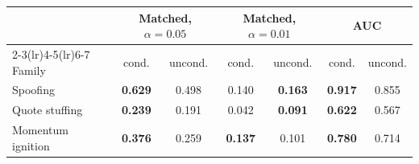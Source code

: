 \begin{tabular}{lcccccc}
\toprule
& \multicolumn{2}{c}{Matched, $\alpha=0.05$} & \multicolumn{2}{c}{Matched, $\alpha=0.01$} & \multicolumn{2}{c}{AUC} \\
\cmidrule(lr){2-3}\cmidrule(lr){4-5}\cmidrule(lr){6-7}
Family & cond. & uncond. & cond. & uncond. & cond. & uncond. \\
\midrule
Spoofing & \textbf{0.629} & 0.498 & 0.140 & \textbf{0.163} & \textbf{0.917} & 0.855 \\
Quote stuffing & \textbf{0.239} & 0.191 & 0.042 & \textbf{0.091} & \textbf{0.622} & 0.567 \\
Momentum ignition & \textbf{0.376} & 0.259 & \textbf{0.137} & 0.101 & \textbf{0.780} & 0.714 \\
\bottomrule
\end{tabular}
